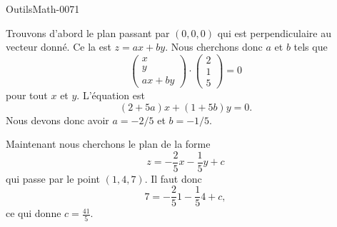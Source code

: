 
\begin{corrige}{OutilsMath-0071}

    Trouvons d'abord le plan passant par $(0,0,0)$ qui est perpendiculaire au vecteur donné. Ce la est $z=ax+by$. Nous cherchons donc $a$ et $b$ tels que
    \begin{equation}
        \begin{pmatrix}
            x    \\ 
            y    \\ 
            ax+by    
        \end{pmatrix}\cdot\begin{pmatrix}
            2    \\ 
            1    \\ 
            5    
        \end{pmatrix}=0
    \end{equation}
    pour tout $x$ et $y$. L'équation est 
    \begin{equation}
        (2+5a)x+(1+5b)y=0.
    \end{equation}
    Nous devons donc avoir $a=-2/5$ et $b=-1/5$.

    Maintenant nous cherchons le plan de la forme
    \begin{equation}
        z=-\frac{ 2 }{ 5 }x-\frac{1}{ 5 }y+c
    \end{equation}
    qui passe par le point $(1,4,7)$. Il faut donc
    \begin{equation}
        7=-\frac{ 2 }{ 5 }1-\frac{1}{ 5 }4+c,
    \end{equation}
    ce qui donne $c=\frac{ 41 }{ 5 }$.

\end{corrige}
